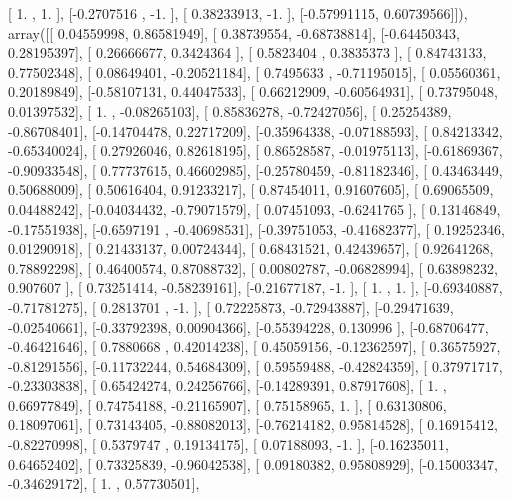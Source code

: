 \documentclass{article}
\begin{document}
       [ 1.        ,  1.        ],
       [-0.2707516 , -1.        ],
       [ 0.38233913, -1.        ],
       [-0.57991115,  0.60739566]]), array([[ 0.04559998,  0.86581949],
       [ 0.38739554, -0.68738814],
       [-0.64450343,  0.28195397],
       [ 0.26666677,  0.3424364 ],
       [ 0.5823404 ,  0.3835373 ],
       [ 0.84743133,  0.77502348],
       [ 0.08649401, -0.20521184],
       [ 0.7495633 , -0.71195015],
       [ 0.05560361,  0.20189849],
       [-0.58107131,  0.44047533],
       [ 0.66212909, -0.60564931],
       [ 0.73795048,  0.01397532],
       [ 1.        , -0.08265103],
       [ 0.85836278, -0.72427056],
       [ 0.25254389, -0.86708401],
       [-0.14704478,  0.22717209],
       [-0.35964338, -0.07188593],
       [ 0.84213342, -0.65340024],
       [ 0.27926046,  0.82618195],
       [ 0.86528587, -0.01975113],
       [-0.61869367, -0.90933548],
       [ 0.77737615,  0.46602985],
       [-0.25780459, -0.81182346],
       [ 0.43463449,  0.50688009],
       [ 0.50616404,  0.91233217],
       [ 0.87454011,  0.91607605],
       [ 0.69065509,  0.04488242],
       [-0.04034432, -0.79071579],
       [ 0.07451093, -0.6241765 ],
       [ 0.13146849, -0.17551938],
       [-0.6597191 , -0.40698531],
       [-0.39751053, -0.41682377],
       [ 0.19252346,  0.01290918],
       [ 0.21433137,  0.00724344],
       [ 0.68431521,  0.42439657],
       [ 0.92641268,  0.78892298],
       [ 0.46400574,  0.87088732],
       [ 0.00802787, -0.06828994],
       [ 0.63898232,  0.907607  ],
       [ 0.73251414, -0.58239161],
       [-0.21677187, -1.        ],
       [ 1.        ,  1.        ],
       [-0.69340887, -0.71781275],
       [ 0.2813701 , -1.        ],
       [ 0.72225873, -0.72943887],
       [-0.29471639, -0.02540661],
       [-0.33792398,  0.00904366],
       [-0.55394228,  0.130996  ],
       [-0.68706477, -0.46421646],
       [ 0.7880668 ,  0.42014238],
       [ 0.45059156, -0.12362597],
       [ 0.36575927, -0.81291556],
       [-0.11732244,  0.54684309],
       [ 0.59559488, -0.42824359],
       [ 0.37971717, -0.23303838],
       [ 0.65424274,  0.24256766],
       [-0.14289391,  0.87917608],
       [ 1.        ,  0.66977849],
       [ 0.74754188, -0.21165907],
       [ 0.75158965,  1.        ],
       [ 0.63130806,  0.18097061],
       [ 0.73143405, -0.88082013],
       [-0.76214182,  0.95814528],
       [ 0.16915412, -0.82270998],
       [ 0.5379747 ,  0.19134175],
       [ 0.07188093, -1.        ],
       [-0.16235011,  0.64652402],
       [ 0.73325839, -0.96042538],
       [ 0.09180382,  0.95808929],
       [-0.15003347, -0.34629172],
       [ 1.        ,  0.57730501],
\end{document}

